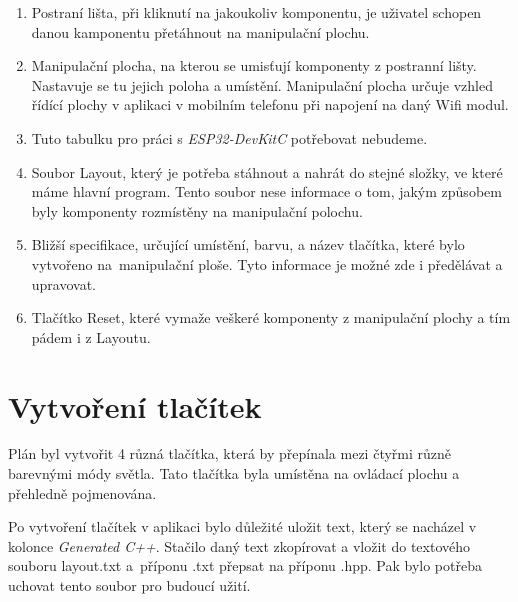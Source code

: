 \begin{enumerate}
	\item Postraní lišta, při kliknutí na jakoukoliv komponentu, je uživatel schopen danou kamponentu přetáhnout na manipulační plochu.
	\item Manipulační plocha, na kterou se umisťují komponenty z postranní lišty. Nastavuje se tu jejich poloha a umístění. Manipulační plocha určuje vzhled řídící plochy v aplikaci v mobilním telefonu při napojení na daný Wifi modul. 
	\item  Tuto tabulku pro práci s \textit{ESP32-DevKitC} potřebovat nebudeme.
	\item  Soubor Layout, který je potřeba stáhnout a nahrát do stejné složky, ve které máme hlavní program. Tento soubor nese informace o tom, jakým způsobem byly komponenty rozmístěny na manipulační polochu.
	\item Bližší specifikace, určující umístění, barvu, a název tlačítka, které bylo vytvořeno na~manipulační ploše. Tyto informace je možné zde i předělávat a upravovat. 
	\item Tlačítko Reset, které vymaže veškeré komponenty z manipulační plochy a tím pádem i z Layoutu.
\end{enumerate}



\section{Vytvoření tlačítek}
Plán byl vytvořit 4 různá tlačítka, která by přepínala mezi čtyřmi různě barevnými módy světla. Tato tlačítka byla umístěna na ovládací plochu a přehledně pojmenována. 

Po vytvoření tlačítek v aplikaci bylo důležité uložit text, který se nacházel v kolonce \textit{Generated C++}. Stačilo daný text zkopírovat a vložit do textového souboru layout.txt a~příponu .txt přepsat na příponu .hpp. Pak bylo potřeba uchovat tento soubor pro budoucí užití.
\newpage



